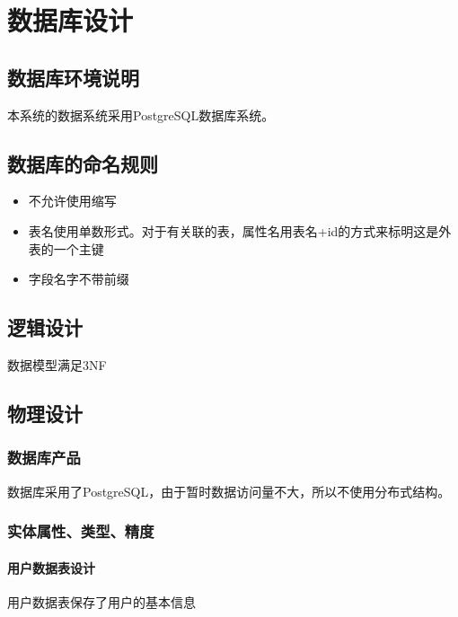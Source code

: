 \chapter{数据库设计}
\section{数据库环境说明}
本系统的数据系统采用PostgreSQL数据库系统。


\section{数据库的命名规则}
\begin{itemize}
	\item 不允许使用缩写
	\item 表名使用单数形式。对于有关联的表，属性名用表名+id的方式来标明这是外表的一个主键
	\item 字段名字不带前缀
\end{itemize}

\section{逻辑设计}

数据模型满足3NF\\

\section{物理设计}

\subsection{数据库产品}

数据库采用了PostgreSQL，由于暂时数据访问量不大，所以不使用分布式结构。

\subsection{实体属性、类型、精度}

\subsubsection{用户数据表设计}

用户数据表保存了用户的基本信息

